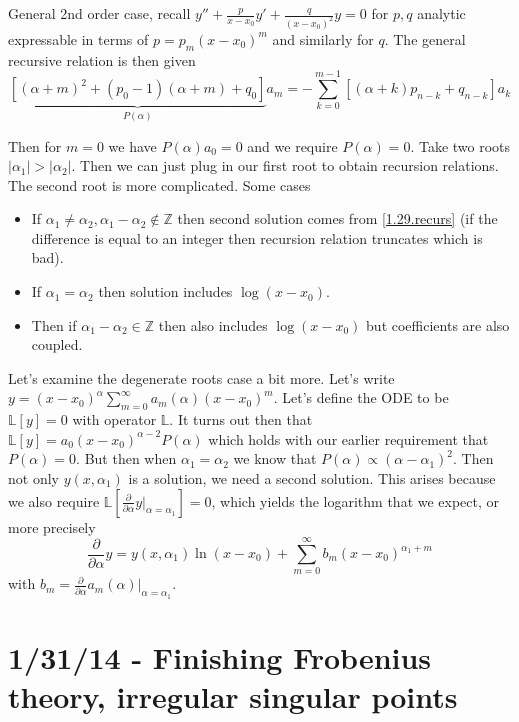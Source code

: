 \documentclass[10pt]{report}
\newcommand{\pd}[2]{\frac{\partial #1}{\partial#2}}
\newcommand{\abs}[1]{\left|#1\right|}
\begin{document}
General 2nd order case, recall $y'' + \frac{p}{x-x_0}y' + \frac{q}{(x-x_0)^2}y = 0$ for $p,q$ analytic expressable in terms of $p =p_m(x-x_0)^m$ and similarly for $q$. The general recursive relation is then given
\begin{equation}
    \underbrace{\left[ (\alpha + m)^2 + (p_0 - 1)(\alpha + m) + q_0 \right]}_{P(\alpha)}a_m = -\sum_{k=0}^{m-1}[(\alpha + k)p_{n-k}+ q_{n-k}]a_k
    \label{1.29.recurs}
\end{equation}

Then for $m=0$ we have $P(\alpha) a_0 = 0$ and we require $P(\alpha) = 0$. Take two roots $\abs{\alpha_1} > \abs{\alpha_2}$. Then we can just plug in our first root to obtain recursion relations. The second root is more complicated. Some cases
\begin{itemize}
    \item If $\alpha_1 \neq \alpha_2, \alpha_1 - \alpha_2 \notin \mathbb{Z}$ then second solution comes from \ref{1.29.recurs} (if the difference is equal to an integer then recursion relation truncates which is bad).
    \item If $\alpha_1 = \alpha_2$ then solution includes $\log(x-x_0)$.
    \item Then if $\alpha_1 - \alpha_2 \in \mathbb{Z}$ then also includes $\log(x-x_0)$ but coefficients are also coupled.
\end{itemize}

Let's examine the degenerate roots case a bit more. Let's write $y = (x-x_0)^\alpha \sum_{m=0}^{\infty}a_m(\alpha)(x-x_0)^m$. Let's define the ODE to be $\mathbb{L}[y] = 0$ with operator $\mathbb{L}$. It turns out then that $\mathbb{L}[y] = a_0(x-x_0)^{\alpha - 2}P(\alpha)$ which holds with our earlier requirement that $P(\alpha) = 0$. But then when $\alpha_1 = \alpha_2$ we know that $P(\alpha) \propto (\alpha - \alpha_1)^2$. Then not only $y(x,\alpha_1)$ is a solution, we need a second solution. This arises because we also require $\mathbb{L}[\pd{}{\alpha}y|_{\alpha = \alpha_1}] = 0$, which yields the logarithm that we expect, or more precisely
\begin{equation}
    \pd{}{\alpha}y = y(x, \alpha_1)\ln(x-x_0) + \sum_{m=0}^{\infty}b_m(x-x_0)^{\alpha_1 + m}
\end{equation}
with $b_m = \pd{}{\alpha}a_m(\alpha)|_{\alpha = \alpha_1}$. 

\chapter{1/31/14 - Finishing Frobenius theory, irregular singular points}
\end{document}
